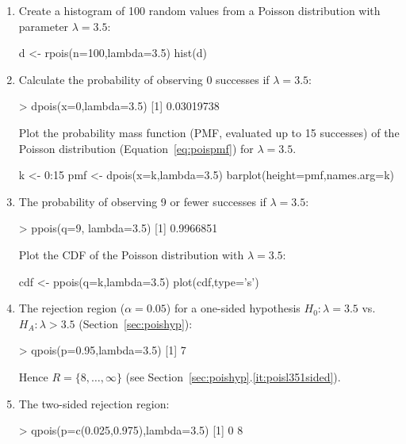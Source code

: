 \begin{enumerate}
\item Create a histogram of 100 random values from a Poisson
  distribution with parameter $\lambda=3.5$:

\begin{script}
d <- rpois(n=100,lambda=3.5)
hist(d)
\end{script}

\item Calculate the probability of observing 0 successes if $\lambda=3.5$:

\begin{console}
> dpois(x=0,lambda=3.5)
[1] 0.03019738
\end{console}

Plot the probability mass function (PMF, evaluated up to 15 successes)
of the Poisson distribution (Equation~\ref{eq:poispmf}) for
$\lambda=3.5$.

\begin{script}
k <- 0:15
pmf <- dpois(x=k,lambda=3.5)
barplot(height=pmf,names.arg=k)
\end{script}

\item The probability of observing 9 or fewer successes if $\lambda=3.5$:

\begin{console}
> ppois(q=9, lambda=3.5)
[1] 0.9966851
\end{console}

Plot the CDF of the Poisson distribution with $\lambda=3.5$:

\begin{script}
cdf <- ppois(q=k,lambda=3.5)
plot(cdf,type='s')
\end{script}

\item\label{it:1sidedpoisR} The rejection region ($\alpha=0.05$) for a
  one-sided hypothesis $H_0: \lambda=3.5$ vs.  $H_{\!A}: \lambda>3.5$
  (Section~\ref{sec:poishyp}):

\begin{console}
> qpois(p=0.95,lambda=3.5)
[1] 7
\end{console}

Hence $R=\{8,\ldots,\infty\}$ (see
Section~\ref{sec:poishyp}.\ref{it:poisl351sided}).

\item\label{it:2sidedpoisR} The two-sided rejection region:

\begin{console}
> qpois(p=c(0.025,0.975),lambda=3.5)
[1] 0 8
\end{console}


\end{enumerate}
